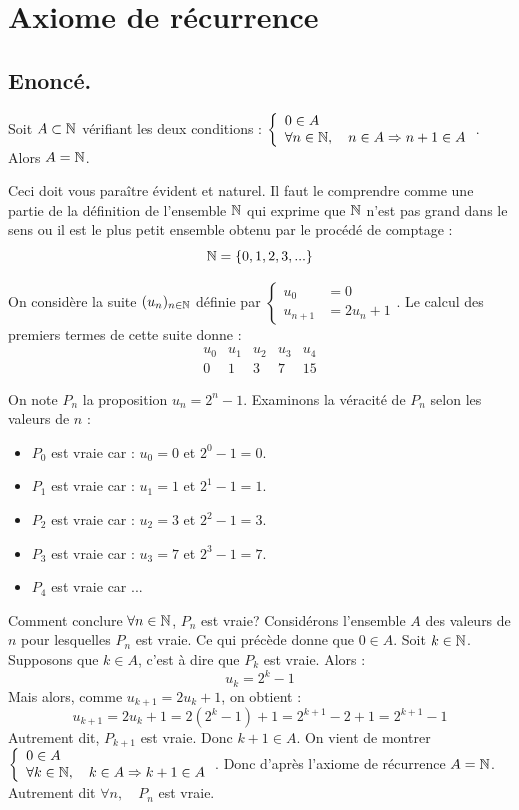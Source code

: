 \documentclass[a4paper,11pt,DIV14,BCOR0mm]{scrartcl}
\begin{document}
\pagebreak
\section{Axiome de récurrence}
\label{axiome}
\subsection{Enoncé.}
\begin{axiome}
	Soit $A\subset\mathbb{N}$ vérifiant les deux conditions : $\left\{\begin{array}{ll}0\in A\\\forall n\in\mathbb{N},\quad n\in A\Rightarrow n+1\in A\end{array}\right.$. Alors $A=\mathbb{N}$.
\end{axiome}
Ceci doit vous paraître évident et naturel. Il faut le comprendre comme une partie de la définition de 
l'ensemble $\mathbb{N}$ qui exprime
que $\mathbb{N}$ \og n'est pas grand\fg{} dans le sens ou il est le plus petit ensemble obtenu par le procédé de comptage :
\[
	\mathbb{N}=\{0, 1, 2, 3, ...\}
\]
\begin{exemple}
	On considère la suite $(u_n)_{n\in\mathbb{N}}$ définie par $\left\{\begin{array}{ll}
	                                                u_0&=0\\
                                                  u_{n+1}&=2u_n+1
	                                                \end{array}\right.$. 
Le calcul des premiers termes de cette suite donne :
\[
 \begin{array}{c|c|c|c|c}
  u_0	&	u_1	&	u_2	&	u_3	&	u_4\\\hline
  0	&	1	&	3	&	7	&	15
 \end{array}
\]

On note $P_n$ la proposition \og$u_n=2^n-1$\fg. Examinons la véracité de $P_n$
selon les valeurs de $n$ :
\begin{itemize}
  \item $P_0$ est vraie car : $u_0 = 0$ et $2^0-1=0$.
  \item $P_1$ est vraie car : $u_1 = 1$ et $2^1-1=1$.
  \item $P_2$ est vraie car : $u_2 = 3$ et $2^2-1=3$.
  \item $P_3$ est vraie car : $u_3 = 7$ et $2^3-1=7$.
  \item $P_4$ est vraie car ...
\end{itemize}
Comment conclure \og$\forall n\in\mathbb{N}$, $P_n$ est vraie\fg?
Considérons l'ensemble $A$ des valeurs de $n$ pour lesquelles $P_n$ est vraie. Ce qui précède donne
que $0\in A$. Soit $k\in\mathbb{N}$. Supposons que $k\in A$, c'est à dire que $P_k$ est vraie. Alors :
\[
	u_k=2^k-1
\]
Mais alors, comme $u_{k+1}=2u_k+1$, on obtient :
\[
	u_{k+1}=2u_k+1=2(2^k-1)+1=2^{k+1}-2+1=2^{k+1}-1
\]
Autrement dit, $P_{k+1}$ est vraie. Donc $k+1\in A$. On vient de montrer 
$\left\{\begin{array}{ll}0\in A\\\forall k\in\mathbb{N},\quad k\in A\Rightarrow k+1\in A\end{array}\right.$.
Donc d'après l'axiome de récurrence $A=\mathbb{N}$. Autrement dit $\forall n,\quad P_n$ est vraie.
\end{exemple}
\end{document}
